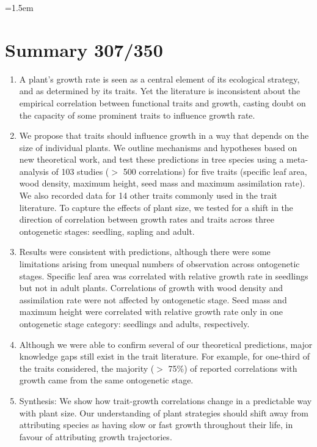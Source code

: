 \documentclass[a4paper,11pt]{article}
\date{}
\begin{document}
\mstitlepage
\noindent
\parindent=1.5em
\addtolength{\parskip}{.3em}
\doublespacing
\linenumbers
\section{Summary 307/350}\label{abstract}
\begin{enumerate}
\def\labelenumi{\arabic{enumi}.}
\itemsep1pt\parskip0pt
\item A plant's growth rate is seen as a central element of its ecological strategy, and as determined by its traits. Yet the literature is inconsistent about the empirical correlation between functional traits and growth, casting doubt on the capacity of some prominent traits to influence growth rate.

\item We propose that traits should influence growth in a way that depends on the size of individual plants. We outline mechanisms and hypotheses based on new theoretical work, and test these predictions in tree species using a meta-analysis of 103 studies ($>$ 500 correlations) for five traits (specific leaf area, wood density, maximum height, seed mass and maximum assimilation rate). We also recorded data for 14 other traits commonly used in the trait literature. To capture the effects of plant size, we tested for a shift in the direction of correlation between growth rates and traits across three ontogenetic stages: seedling, sapling and adult.

\item Results were consistent with predictions, although there were some limitations arising from unequal numbers of observation across ontogenetic stages. Specific leaf area was correlated with relative growth rate in seedlings but not in adult plants. Correlations of growth with wood density and assimilation rate were not affected by ontogenetic stage. Seed mass and maximum height were correlated with relative growth rate only in one ontogenetic stage category: seedlings and adults, respectively.

\item Although we were able to confirm several of our theoretical predictions, major knowledge gaps still exist in the trait literature. For example, for one-third of the traits considered, the majority ($>$ 75\%) of reported correlations with growth came from the same ontogenetic stage.

\item Synthesis: We show how trait-growth correlations change in a predictable way with plant size. Our understanding of plant strategies should shift away from attributing species as having slow or fast growth throughout their life, in favour of attributing growth trajectories.
\end{enumerate}
\end{document}
